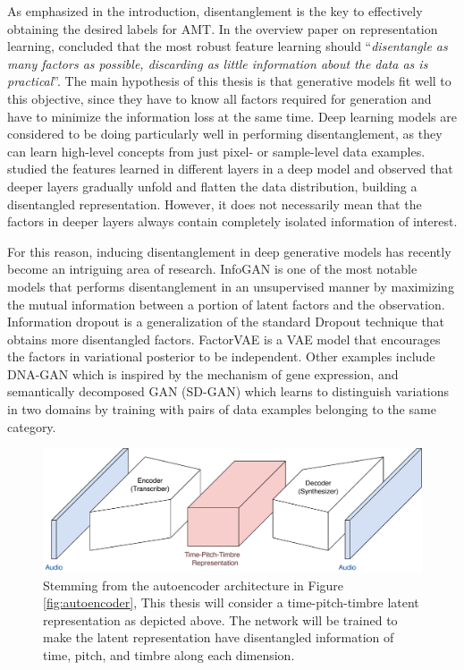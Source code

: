 As emphasized in the introduction, disentanglement is the key to effectively obtaining the desired labels for AMT.
In the overview paper on representation learning,  concluded that the most robust feature learning should ``\emph{disentangle as many factors as possible, discarding as little information about the data as is practical}''.
The main hypothesis of this thesis is that generative models fit well to this objective, since they have to know all factors required for generation and have to minimize the information loss at the same time.
Deep learning models are considered to be doing particularly well in performing disentanglement, as they can learn high-level concepts from just pixel- or sample-level data examples.
 studied the features learned in different layers in a deep model and observed that deeper layers gradually unfold and flatten the data distribution, building a disentangled representation.
However, it does not necessarily mean that the factors in deeper layers always contain completely isolated information of interest.

For this reason, inducing disentanglement in deep generative models has recently become an intriguing area of research.
InfoGAN \cite{chen2016infogan} is one of the most notable models that performs disentanglement in an unsupervised manner by maximizing the mutual information between a portion of latent factors and the observation.
Information dropout \cite{achille2018information} is a generalization of the standard Dropout technique that obtains more disentangled factors.
FactorVAE \cite{kim2018factor} is a VAE model that encourages the factors in variational posterior to be independent.
Other examples include DNA-GAN \cite{xiao2017dnagan} which is inspired by the mechanism of gene expression,
and semantically decomposed GAN (SD-GAN) \cite{donahue2017gan} which learns to distinguish variations in two domains by training with pairs of data examples belonging to the same category.

\begin{figure}
\centering
\includegraphics[width=\textwidth]{ae-architecture.pdf}
\caption{Stemming from the autoencoder architecture in Figure \ref{fig:autoencoder}, This thesis will consider a time-pitch-timbre latent representation as depicted above. The network will be trained to make the latent representation have disentangled information of time, pitch, and timbre along each dimension.}
\label{fig:time-pitch-timbre-ae}
\end{figure}

